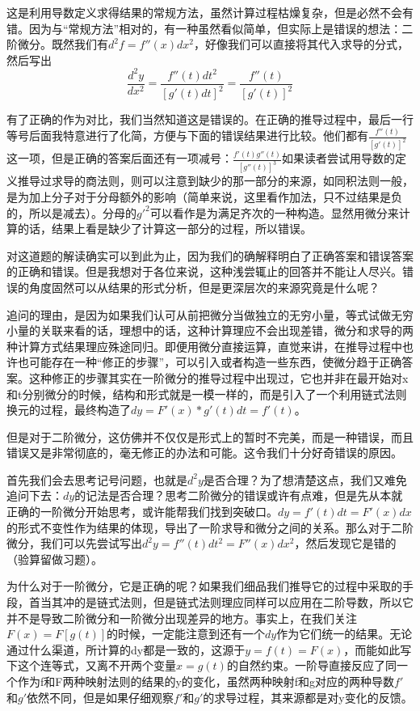 \documentclass[fontset=none]{ctexart}
\begin{document}
这是利用导数定义求得结果的常规方法，虽然计算过程枯燥复杂，但是必然不会有错。因为与“常规方法”相对的，有一种虽然看似简单，但实际上是错误的想法：二阶微分。既然我们有$d^2f=f''\left( x \right) dx^2$，好像我们可以直接将其代入求导的分式，然后写出
$$\frac{d^2y}{dx^2}=\frac{f''\left( t \right) dt^2}{\left[ g'\left( t \right) dt \right] ^2}=\frac{f''\left( t \right)}{\left[ g'\left( t \right) \right] ^2}$$

有了正确的作为对比，我们当然知道这是错误的。在正确的推导过程中，最后一行等号后面我特意进行了化简，方便与下面的错误结果进行比较。他们都有$\frac{f''\left( t \right)}{\left[ g'\left( t \right) \right] ^2}$这一项，但是正确的答案后面还有一项减号：$\frac{f'\left( t \right) g''\left( t \right)}{\left[ g''\left( t \right) \right] ^3}$如果读者尝试用导数的定义推导过求导的商法则，则可以注意到缺少的那一部分的来源，如同积法则一般，是为加上分子对于分母额外的影响（简单来说，这里看作加法，只不过结果是负的，所以是减去）。分母的$g'^2$可以看作是为满足齐次的一种构造。显然用微分来计算的话，结果上看是缺少了计算这一部分的过程，所以错误。

\songti 对这道题的解读确实可以到此为止，因为我们的确解释明白了正确答案和错误答案的正确和错误。但是我想对于各位来说，这种浅尝辄止的回答并不能让人尽兴。错误的角度固然可以从结果的形式分析，但是更深层次的来源究竟是什么呢？

追问的理由，是因为如果我们认可从前把微分当做独立的无穷小量，等式试做无穷小量的关联来看的话，理想中的话，这种计算理应不会出现差错，微分和求导的两种计算方式结果理应殊途同归。即便用微分直接运算，直觉来讲，在推导过程中也许也可能存在一种“修正的步骤”，可以引入或者构造一些东西，使微分趋于正确答案。这种修正的步骤其实在一阶微分的推导过程中出现过，它也并非在最开始对x和t分别微分的时候，结构和形式就是一模一样的，而是引入了一个利用链式法则换元的过程，最终构造了$dy=F'(x)*g'(t)dt=f'(t)$。

但是对于二阶微分，这仿佛并不仅仅是形式上的暂时不完美，而是一种错误，而且错误又是非常彻底的，毫无修正的办法和可能。这令我们十分好奇错误的原因。

首先我们会去思考记号问题，也就是$d^2y$是否合理？为了想清楚这点，我们又难免追问下去：$dy$的记法是否合理？思考二阶微分的错误或许有点难，但是先从本就正确的一阶微分开始思考，或许能帮我们找到突破口。$dy=f'(t)dt=F'(x)dx$的形式不变性作为结果的体现，导出了一阶求导和微分之间的关系。那么对于二阶微分，我们可以先尝试写出$d^2y=f''(t)dt^2=F''(x)dx^2$，然后发现它是错的（验算留做习题）。

为什么对于一阶微分，它是正确的呢？如果我们细品我们推导它的过程中采取的手段，首当其冲的是链式法则，但是链式法则理应同样可以应用在二阶导数，所以它并不是导致二阶微分和一阶微分出现差异的地方。事实上，在我们关注$F\left( x \right) =F\left[ g\left( t \right) \right]$的时候，一定能注意到还有一个$dy$作为它们统一的结果。无论通过什么渠道，所计算的dy都是一致的，这源于$y=f(t)=F(x)$，而能如此写下这个连等式，又离不开两个变量$x=g(t)$的自然约束。一阶导直接反应了同一个作为f和F两种映射法则的结果的y的变化，虽然两种映射f和g对应的两种导数$f'$和$g'$依然不同，但是如果仔细观察$f'$和$g'$的求导过程，其来源都是对y变化的反馈。
\end{document}
